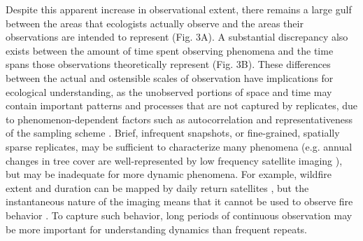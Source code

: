\documentclass[12pt]{article}
\begin{document}
Despite this apparent increase in observational extent, there remains a large gulf between the areas that ecologists actually observe and the areas their observations are intended to represent (Fig. 3A). A substantial discrepancy also exists between the amount of time spent observing phenomena and the time spans those observations theoretically represent (Fig. 3B). These differences between the actual and ostensible scales of observation have implications for ecological understanding, as the unobserved portions of space and time may contain important patterns and processes that are not captured by replicates, due to phenomenon-dependent factors such as autocorrelation and representativeness of the sampling scheme \cite{underwood_experiments_1997,palmer_scale_1994, cao_comparison_2002, legendre_spatial_1993,collins_method_2000}. Brief, infrequent snapshots, or fine-grained, spatially sparse replicates, may be sufficient to characterize many phenomena (e.g. annual changes in tree cover are well-represented by low frequency satellite imaging \cite{hansen_high-resolution_2013}), but may be inadequate for more dynamic phenomena. For example, wildfire extent and duration can be mapped by daily return satellites \cite{roy_prototyping_2005,jones_fire_2009}, but the instantaneous nature of the imaging means that it cannot be used to observe fire behavior \cite{clements_observing_2007}. To capture such behavior, long periods of continuous observation may be more important for understanding dynamics than frequent repeats. 
\end{document}
